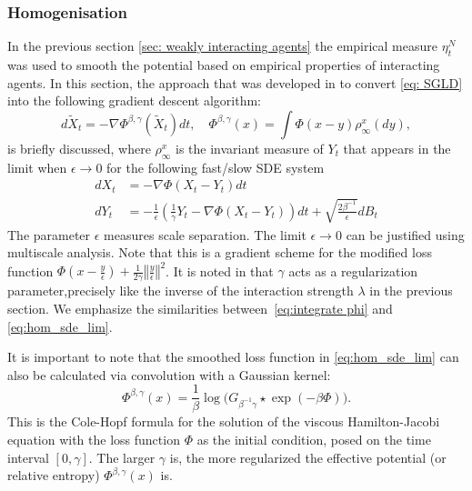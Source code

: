 \documentclass{article}
\begin{document}
\subsubsection{Homogenisation}

In the previous section \ref{sec: weakly interacting agents} the empirical measure $\eta_{t}^{N}$ was used
to smooth the potential based on empirical properties of interacting
agents. In this section, the approach that
was developed in \cite{Chaudhari2017DeepRP} to convert \ref{eq: SGLD}
into the following gradient descent algorithm: 
\begin{equation}
d\tilde{X}_{t}=-\nabla\Phi^{\beta,\gamma}(\tilde{X}_{t})dt,\quad\Phi^{\beta,\gamma}\left(x\right)=\int\Phi(x-y)\rho_{\infty}^{x}(dy),\label{eq:hom_sde_lim}
\end{equation}
is briefly discussed, where $\rho_{\infty}^{x}$ is the invariant measure of $Y_{t}$ that
appears in the limit when $\epsilon\rightarrow0$ for the following
fast/slow SDE system \begin{subequations}\label{eq:hom_sde_v2} 
\begin{align}
dX_{t} & =-\nabla\Phi(X_{t}-Y_{t})dt\label{eq:hom_sde_v2_1}\\
dY_{t} & =-\frac{1}{\epsilon}\left(\frac{1}{\gamma}Y_{t}-\nabla\Phi(X_{t}-Y_{t})\right)dt+\sqrt{\frac{2\beta^{-1}}{\epsilon}}dB_{t}\label{eq:hom_sde_v2_2}
\end{align}
\end{subequations}The parameter $\epsilon$ measures scale separation.
The limit $\epsilon\rightarrow0$ can be justified using multiscale
analysis. Note that this is a gradient
scheme for the modified loss function $\Phi(x-\frac{y}{\epsilon})+\frac{1}{2\gamma}\left\Vert \frac{y}{\epsilon}\right\Vert ^{2}$.
It is noted in \cite{kantas2019sharpflatshallowweakly} that $\gamma$ acts as a regularization parameter,precisely like the inverse of the interaction strength $\lambda$
in the previous section. We emphasize the similarities between~\ref{eq:integrate phi}
and \ref{eq:hom_sde_lim}.

It is important to note that the smoothed loss function in \ref{eq:hom_sde_lim}
can also be calculated via convolution with a Gaussian kernel: 
\begin{equation}
\Phi^{\beta,\gamma}(x)=\frac{1}{\beta}\log\Big(G_{\beta^{-1}\gamma}\star\exp(-\beta\Phi)\Big).\label{e:phi-cole-hopf}
\end{equation}
This is the Cole-Hopf formula for the solution of the viscous Hamilton-Jacobi
equation with the loss function $\Phi$ as the initial condition,
posed on the time interval $[0,\gamma]$. The larger $\gamma$ is,
the more regularized the effective potential (or relative entropy)
$\Phi^{\beta,\gamma}(x)$ is. \\ 
\end{document}
